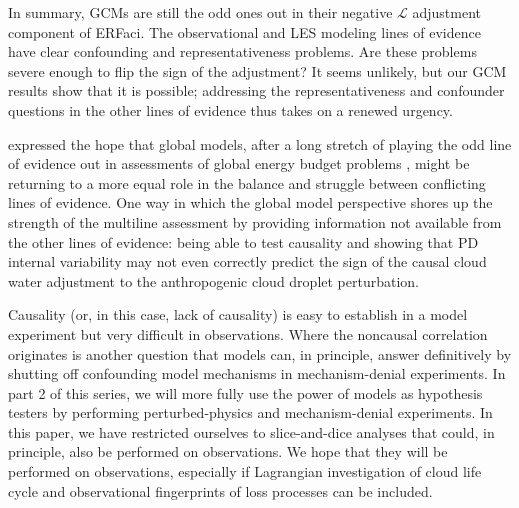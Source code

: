 \documentclass[acp, manuscript]{copernicus}\usepackage[]{graphicx}\usepackage[]{xcolor}
\newcommand\nd{\ensuremath{N_d}}
\newcommand\lwp{\ensuremath{\mathcal L}}
\begin{document}

In summary, GCMs are still the odd ones out in their negative \lwp{} adjustment
component of ERFaci.  The observational and LES modeling lines of evidence have clear
confounding and representativeness problems.  Are these problems severe enough
to flip the sign of the adjustment?  It seems unlikely, but our GCM results show that it is
possible; addressing the representativeness and confounder questions in the other lines of evidence
thus takes on a renewed urgency.

\conclusions  %

\citet{Muelmenstaedt2021b} expressed the hope that global models, after a long
stretch of playing the odd line of evidence out in assessments of global energy
budget problems \citep{Bellouin2020, Sherwood2020}, might be returning to a more
equal role in the balance and struggle between conflicting lines of evidence.
One way in which the global model
perspective shores up the strength of the multiline assessment by providing
information not available from the other lines of evidence: being able to test causality and showing that PD internal variability
may not even correctly predict the sign of the causal cloud water adjustment to the
anthropogenic cloud droplet perturbation.



Causality (or, in this case, lack of causality) is easy to establish in a model
experiment but very difficult in observations.  Where the noncausal correlation
originates is another question that models can, in principle, answer
definitively by shutting off confounding model mechanisms in
mechanism-denial experiments.  In part 2 of this series, we will more fully use the power of
models as hypothesis testers by performing perturbed-physics and
mechanism-denial experiments.  In this paper, we have restricted ourselves to
slice-and-dice analyses that could, in principle, also be performed on
observations.  We hope that they will be performed on observations, especially
if Lagrangian investigation of cloud life cycle \citep[e.g.,][]{Eastman2022,Christensen2023} and
observational fingerprints of loss processes \citep[e.g.,][]{Varble2023} can be
included.
\end{document}
